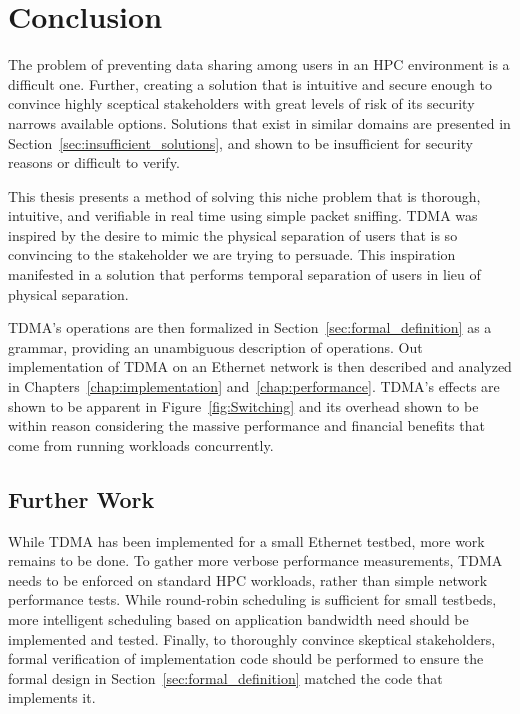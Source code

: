 \documentclass[oneside,12pt]{memoir}
\begin{document}
\chapter{Conclusion}
The problem of preventing data sharing among users in an HPC environment is a difficult one. Further, creating a solution that is intuitive and secure enough to convince highly sceptical stakeholders with great levels of risk of its security narrows available options. Solutions that exist in similar domains are presented in Section~\ref{sec:insufficient_solutions}, and shown to be insufficient for security reasons or difficult to verify.

This thesis presents a method of solving this niche problem that is thorough, intuitive, and verifiable in real time using simple packet sniffing. TDMA was inspired by the desire to mimic the physical separation of users that is so convincing to the stakeholder we are trying to persuade. This inspiration manifested in a solution that performs temporal separation of users in lieu of physical separation.

TDMA's operations are then formalized in Section~\ref{sec:formal_definition} as a grammar, providing an unambiguous description of operations. Out implementation of TDMA on an Ethernet network is then described and analyzed in Chapters~\ref{chap:implementation} and~\ref{chap:performance}. TDMA's effects are shown to be apparent in Figure~\ref{fig:Switching} and its overhead shown to be within reason considering the massive performance and financial benefits that come from running workloads concurrently.
\section{Further Work}
While TDMA has been implemented for a small Ethernet testbed, more work remains to be done. To gather more verbose performance measurements, TDMA needs to be enforced on standard HPC workloads, rather than simple network performance tests. While round-robin scheduling is sufficient for small testbeds, more intelligent scheduling based on application bandwidth need should be implemented and tested. Finally, to thoroughly convince skeptical stakeholders, formal verification of implementation code should be performed to ensure the formal design in Section~\ref{sec:formal_definition} matched the code that implements it.
\appendix
\end{document}

